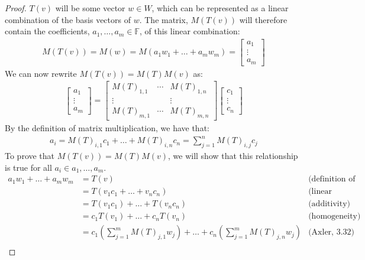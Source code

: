 \documentclass[12pt,reqno]{article}
\theoremstyle{definition}
\begin{document}
\begin{proof}
    $T(v)$ will be some vector $w \in W$, which can be represented as a linear combination of the basis vectors of $w$. The matrix, $M(T(v))$ will therefore contain the coefficients, $a_1,\ldots,a_m \in \mathbb{F}$, of this linear combination:
    \begin{align*}
        M(T(v)) = M(w) = M(a_1w_1+\ldots+a_mw_m) =
        \begin{bmatrix}
            a_1 \\ \vdots \\ a_m
        \end{bmatrix}
    \end{align*}
    We can now rewrite $M(T(v)) = M(T)M(v)$ as:
    \begin{align*}
        \begin{bmatrix}
            a_1 \\ \vdots \\ a_m
        \end{bmatrix}
        =
        \begin{bmatrix}
            M(T)_{1,1} & \cdots & M(T)_{1,n}\\
            \vdots & & \vdots \\
            M(T)_{m, 1} & \cdots & M(T)_{m, n}
        \end{bmatrix}
        \begin{bmatrix}
            c_1 \\ \vdots \\ c_n
        \end{bmatrix}
    \end{align*}
    By the definition of matrix multiplication, we have that:
    \begin{align*}
        a_i = M(T)_{i,1}c_1+\ldots+M(T)_{i,n}c_n = \sum_{j=1}^{n}M(T)_{i,j}c_j
    \end{align*}
    To prove that $M(T(v)) = M(T)M(v)$, we will show that this relationship is true for all $a_i \in a_1,\ldots,a_m$.
    \begin{align*}
        a_1w_1+\ldots+a_mw_m &= T(v) & \text{(definition of T)}\\
        &= T(v_1c_1+\ldots+v_nc_n) & \text{(linear combination)}\\
        &= T(v_1c_1)+\ldots+T(v_nc_n) & \text{(additivity)}\\
        &= c_1T(v_1)+\ldots+c_nT(v_n) & \text{(homogeneity)}\\
        &= c_1(\sum_{j=1}^{m}M(T)_{j,1}w_j)+\ldots+c_n(\sum_{j=1}^{m}M(T)_{j,n}w_j) & \text{(Axler, 3.32)}\\

\end{align*}
\end{proof}
\end{document}
